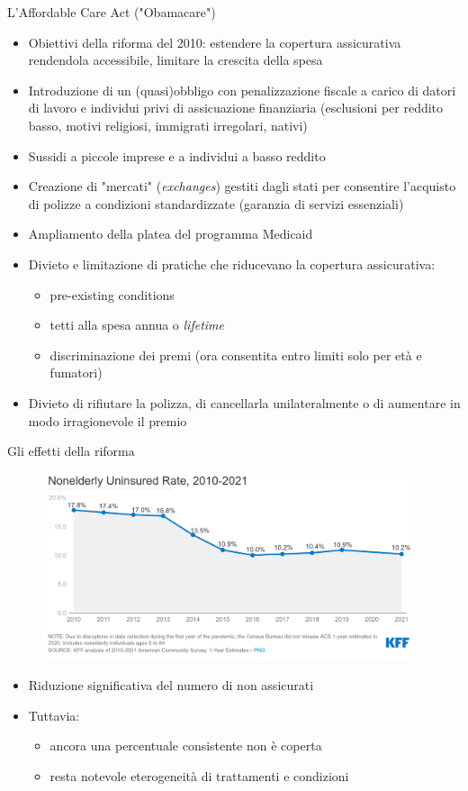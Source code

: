 \documentclass[aspectratio=149,11pt]{beamer}
\begin{document}
\begin{frame}{L'Affordable Care Act ("Obamacare")}
\small
\begin{itemize}
\item Obiettivi della riforma del 2010: estendere la copertura assicurativa
rendendola accessibile, limitare la crescita della spesa
\item Introduzione di un (quasi)obbligo con penalizzazione fiscale a carico di
datori di lavoro e individui privi di assicuazione finanziaria (esclusioni
per reddito basso, motivi religiosi, immigrati irregolari, nativi)
\item Sussidi a piccole imprese e a individui a basso reddito
\item Creazione di "mercati" (\emph{exchanges}) gestiti dagli stati per consentire
l'acquisto di polizze a condizioni standardizzate (garanzia di servizi
essenziali)
\item Ampliamento della platea del programma Medicaid
\item Divieto e limitazione di pratiche che riducevano la copertura assicurativa:
\begin{itemize}
\item pre-existing conditions
\item tetti alla spesa annua o \emph{lifetime}
\item discriminazione dei premi (ora consentita entro limiti solo per età e
fumatori)
\end{itemize}
\item Divieto di rifiutare la polizza, di cancellarla unilateralmente o di
aumentare in modo irragionevole il premio
\end{itemize}
\end{frame}

\begin{frame}{Gli effetti della riforma}
\begin{figure}[htbp]
\centering
\includegraphics[height=5.5cm]{./figure/nonelderly-uninsured-rate.png}
\end{figure}

\begin{itemize}
\item Riduzione significativa del numero di non assicurati
\item Tuttavia:
\begin{itemize}
\item ancora una percentuale consistente non è coperta
\item resta notevole eterogeneità di trattamenti e condizioni
\end{itemize}
\end{itemize}
\end{frame}
\end{document}
